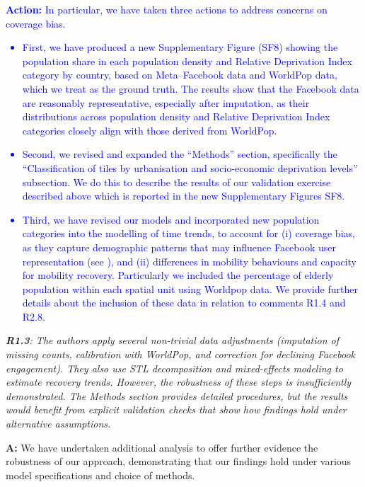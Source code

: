 \documentclass[12pt,a4paper,oneside, reqno]{amsart}
\begin{document}
\textcolor{blue}{\textbf{Action:} In particular, we have taken three actions to address concerns on coverage bias. 
\begin{itemize}[noitemsep, topsep=0pt]
    \item First, we have produced a new Supplementary Figure (SF8) showing the population share in each population density and Relative Deprivation Index category by country, based on Meta–Facebook data and WorldPop data, which we treat as the ground truth. The results show that the Facebook data are reasonably representative, especially after imputation, as their distributions across population density and Relative Deprivation Index categories closely align with those derived from WorldPop.
    \item Second, we revised and expanded the ``Methods'' section, specifically the ``Classification of tiles by urbanisation and socio-economic deprivation levels'' subsection. We do this to describe the results of our validation exercise described above which is reported in the new Supplementary Figures SF8. 
    \item Third, we have revised our models and incorporated new population categories into the modelling of time trends, to account for (i) coverage bias, as they capture demographic patterns that may influence Facebook user representation (see \parencite{cabrera2025bias}), and (ii) differences in mobility behaviours and capacity for mobility recovery. Particularly we included the percentage of elderly population within each spatial unit using Worldpop data. We provide further details about the inclusion of these data in relation to comments R1.4 and R2.8.
\end{itemize}}

\setlength{\leftskip}{0cm} \textit{\textbf{R1.3}: The authors apply several non-trivial data adjustments (imputation of missing counts, calibration with WorldPop, and correction for declining Facebook engagement). They also use STL decomposition and mixed-effects modeling to estimate recovery trends. However, the robustness of these steps is insufficiently demonstrated. The Methods section provides detailed procedures, but the results would benefit from explicit validation checks that show how findings hold under alternative assumptions.}

\setlength{\leftskip}{1cm}\textbf{A:} We have undertaken additional analysis to offer further evidence the robustness of our approach, demonstrating that our findings hold under various model specifications and choice of methods.
\end{document}
